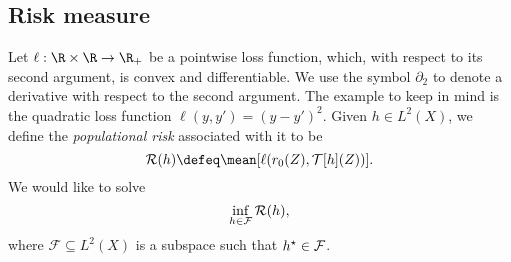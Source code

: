 \subsection{Risk measure}

Let $ \ell : \R \times \R \to \R_{ + } $ be a pointwise loss function, which, with respect to its second argument, is convex and differentiable.
We use the symbol $ \partial_{ 2 } $ to denote a derivative with respect to the second argument.
The example to keep in mind is the quadratic loss function $ \ell ( y, y' ) = ( y - y' )^2 $.
Given $ h \in L^{ 2 } ( X ) $, we define the \emph{populational risk} associated with it to be
\begin{equation*}
    \risk ( h ) \defeq \mean [ \ell ( r_{ 0 } ( Z ), \mathcal{T} [ h ] ( Z ) ) ]
.\end{equation*}
We would like to solve
\begin{equation*}
    \inf_{ h \in \mathcal{F} } \mathcal{R} ( h )
,\end{equation*}
where $ \mathcal{F} \subseteq L^{ 2 } ( X ) $ is a subspace such that $ h^{ \star } \in \mathcal{F} $.
